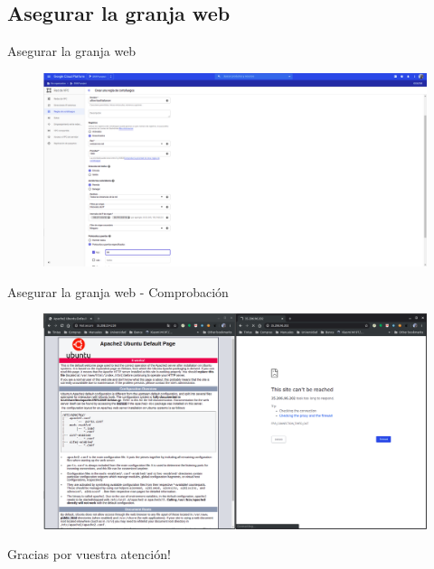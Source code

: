 \documentclass{beamer}
\begin{document}
\subsection{Asegurar la granja web}

\begin{frame}[fragile]{Asegurar la granja web}
  \begin{figure}[H]
		\centering
		\includegraphics[width=\textwidth]{project/firewall_balancer.png}
	\end{figure}
\end{frame}

\begin{frame}[fragile]{Asegurar la granja web - Comprobación}
  \begin{figure}[H]
		\centering
		\includegraphics[width=\textwidth]{project/new_firewall_ok.png}
	\end{figure}
\end{frame}

\begin{frame}[fragile]
 \begin{center}
  \Huge
  Gracias por vuestra atención!
 \end{center}

\end{frame}
\end{document}
